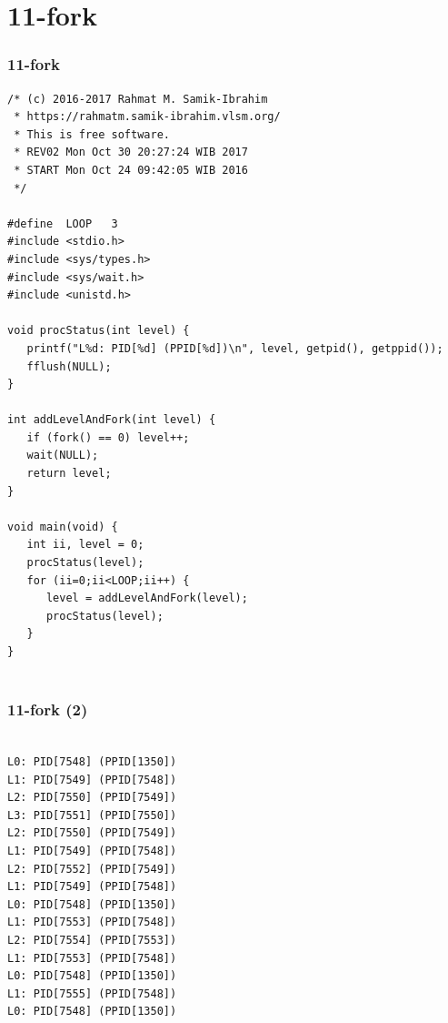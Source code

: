 \documentclass[xcolor=table, notheorems, hyperref={pdfpagelabels=false}]{beamer}
\begin{document}
\section{11-fork}
\begin{frame}[fragile]
\frametitle{11-fork}
\begin{lstlisting}[basicstyle=\ttfamily\tiny]
/* (c) 2016-2017 Rahmat M. Samik-Ibrahim
 * https://rahmatm.samik-ibrahim.vlsm.org/
 * This is free software.
 * REV02 Mon Oct 30 20:27:24 WIB 2017
 * START Mon Oct 24 09:42:05 WIB 2016
 */

#define  LOOP   3
#include <stdio.h>
#include <sys/types.h>
#include <sys/wait.h>
#include <unistd.h>

void procStatus(int level) {
   printf("L%d: PID[%d] (PPID[%d])\n", level, getpid(), getppid());
   fflush(NULL);
}

int addLevelAndFork(int level) {
   if (fork() == 0) level++;
   wait(NULL);
   return level;
}

void main(void) {
   int ii, level = 0;
   procStatus(level);
   for (ii=0;ii<LOOP;ii++) {
      level = addLevelAndFork(level);
      procStatus(level);
   }
}
 
\end{lstlisting}
\end{frame}

\begin{frame}[fragile]
\frametitle{11-fork (2)}
\begin{lstlisting}[basicstyle=\ttfamily\footnotesize]

L0: PID[7548] (PPID[1350])
L1: PID[7549] (PPID[7548])
L2: PID[7550] (PPID[7549])
L3: PID[7551] (PPID[7550])
L2: PID[7550] (PPID[7549])
L1: PID[7549] (PPID[7548])
L2: PID[7552] (PPID[7549])
L1: PID[7549] (PPID[7548])
L0: PID[7548] (PPID[1350])
L1: PID[7553] (PPID[7548])
L2: PID[7554] (PPID[7553])
L1: PID[7553] (PPID[7548])
L0: PID[7548] (PPID[1350])
L1: PID[7555] (PPID[7548])
L0: PID[7548] (PPID[1350])

\end{lstlisting}
\end{frame}
\end{document}

